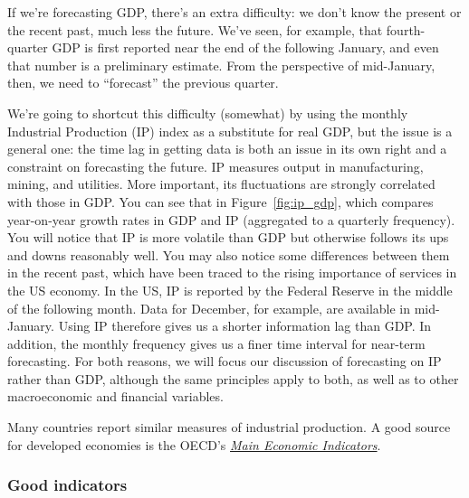 \documentclass[letterpaper,12pt]{article}
\begin{document}
If we're forecasting GDP, there's an extra difficulty: we don't
know the present or the recent past, much less the future. We've
seen, for example, that fourth-quarter GDP is first reported near
the end of the following January, and even that number is a
preliminary estimate. From the perspective of mid-January, then,
we need to ``forecast'' the previous quarter.

We're going to shortcut this difficulty (somewhat) by using the
monthly Industrial Production (IP) index as a substitute for real
GDP, but the issue is a general one:  the time lag in getting data
is both an issue in its own right and a  constraint on forecasting
the future. IP measures output in manufacturing, mining, and
utilities. More important, its fluctuations are strongly
correlated with those in GDP.  You can see that in
Figure~\ref{fig:ip_gdp}, which compares year-on-year growth rates
in GDP and IP (aggregated to a quarterly frequency). You will
notice that IP is more volatile than GDP but otherwise follows its
ups and downs reasonably well.  You may also notice some
differences between them in the recent past, which have been
traced to the rising importance of services in the US economy.  In
the US, IP is reported by the Federal Reserve in the middle of the
following month.  Data for December, for example, are available in
mid-January.  Using IP therefore gives us a shorter information
lag than GDP.  In addition, the monthly frequency gives us a finer
time interval for near-term forecasting.  For both reasons, we
will focus our discussion of forecasting on IP rather than GDP,
although the same principles apply to both, as well as to other
macroeconomic and financial variables.


Many countries report similar measures of industrial production. A good source for developed
economies is the OECD's
\href{http://www.oecd.org/document/54/0,2340,en_2649_37461_15569334_1_1_1_37461,00.html}{\it Main
Economic Indicators\/}.


\subsubsection*{Good indicators}
\end{document}
